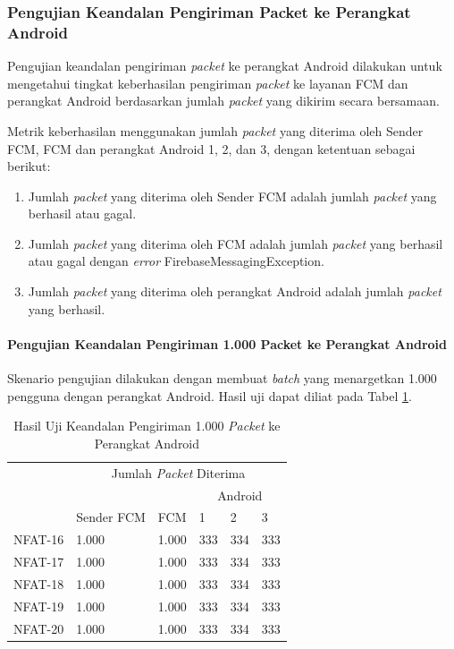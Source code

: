 \subsubsection{Pengujian Keandalan Pengiriman Packet ke Perangkat Android}
\par Pengujian keandalan pengiriman \textit{packet} ke perangkat Android dilakukan untuk mengetahui tingkat keberhasilan pengiriman \textit{packet} ke layanan FCM dan perangkat Android berdasarkan jumlah \textit{packet} yang dikirim secara bersamaan.
\par Metrik keberhasilan menggunakan jumlah \textit{packet} yang diterima oleh Sender FCM, FCM dan perangkat Android 1, 2, dan 3, dengan ketentuan sebagai berikut:
\begin{enumerate}
	\item Jumlah \textit{packet} yang diterima oleh Sender FCM adalah jumlah \textit{packet} yang berhasil atau gagal.
	\item Jumlah \textit{packet} yang diterima oleh FCM adalah jumlah \textit{packet} yang berhasil atau gagal dengan \textit{error} FirebaseMessagingException.
	\item Jumlah \textit{packet} yang diterima oleh perangkat Android adalah jumlah \textit{packet} yang berhasil.
\end{enumerate}


\paragraph{Pengujian Keandalan Pengiriman 1.000 Packet ke Perangkat Android}
\par Skenario pengujian dilakukan dengan membuat \textit{batch} yang menargetkan 1.000 pengguna dengan perangkat Android. Hasil uji dapat diliat pada Tabel \ref{t:keandalan-android-1k}.
\begin{longtable}{|p{1.5cm}|p{2cm}|p{1.5cm}|p{1cm}|p{1cm}|p{1cm}|}
	\caption{Hasil Uji Keandalan Pengiriman 1.000 \textit{Packet} ke Perangkat Android} \label{t:keandalan-android-1k} \\ \hline
	\rowcolor{lightgray} & \multicolumn{5}{c|}{Jumlah \textit{Packet} Diterima} \\ \hhline{~|*5{-}|}
	\rowcolor{lightgray} & & & \multicolumn{3}{c|}{Android} \\ \hhline{~~~|*3{-}|}
	\rowcolor{lightgray} \multirow{-3}{*}{Kode} & \multirow{-2}{*}{Sender FCM} & \multirow{-2}{*}{FCM} & 1 & 2 & 3 \\ \hline
	NFAT-16 & 1.000 & 1.000 & 333 & 334 & 333 \\ \hline
	NFAT-17 & 1.000 & 1.000 & 333 & 334 & 333 \\ \hline
	NFAT-18 & 1.000 & 1.000 & 333 & 334 & 333 \\ \hline
	NFAT-19 & 1.000 & 1.000 & 333 & 334 & 333 \\ \hline
	NFAT-20 & 1.000 & 1.000 & 333 & 334 & 333 \\ \hline
\end{longtable}

